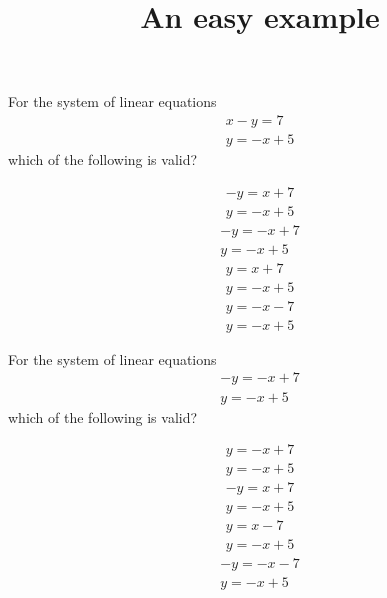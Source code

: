 \documentclass{webquiz}
\title{An easy example}
\begin{document}
\begin{question} %
For the system of linear equations
\begin{gather*} 
x-y=7\\
y=-x+5
\end{gather*}
which of the following is valid?
\begin{choice}[columns=2] %
\incorrect
\begin{gather*} 
-y=x+7\\
y=-x+5
\end{gather*}
\correct
\begin{gather*} 
-y=-x+7\\
y=-x+5
\end{gather*}
\incorrect
\begin{gather*} 
y=x+7\\
y=-x+5
\end{gather*}
\incorrect
\begin{gather*} 
y=-x-7\\
y=-x+5
\end{gather*}
\end{choice}
\end{question}



\begin{question} %
For the system of linear equations
\begin{gather*} 
-y=-x+7\\
y=-x+5
\end{gather*}
which of the following is valid?
\begin{choice}[columns=2] %
\incorrect
\begin{gather*} 
y=-x+7\\
y=-x+5
\end{gather*}
\incorrect
\begin{gather*} 
-y=x+7\\
y=-x+5
\end{gather*}
\correct
\begin{gather*} 
y=x-7\\
y=-x+5
\end{gather*}
\incorrect
\begin{gather*} 
-y=-x-7\\
y=-x+5
\end{gather*}
\end{choice}
\end{question}
\end{document}
